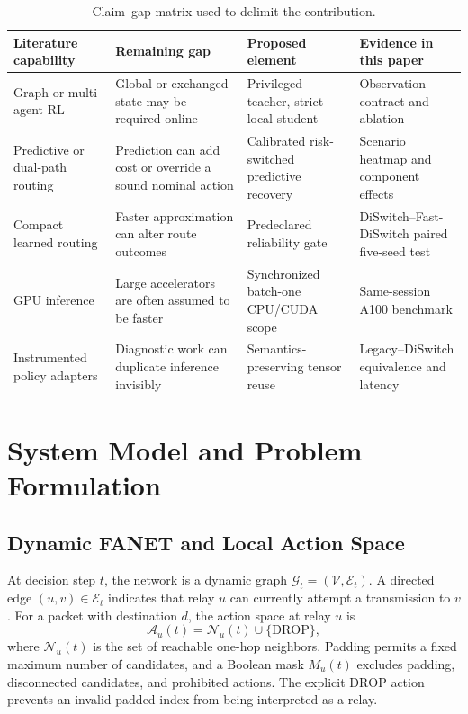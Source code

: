\documentclass{ieeeaccess}
\newcommand{\drop}{\mathrm{DROP}}
\begin{document}
\begin{table}[t]
\caption{Claim--gap matrix used to delimit the contribution.}
\label{tab:novelty}
\centering\small
\begin{tabularx}{\textwidth}{p{}p{}p{}X}
\toprule
Literature capability & Remaining gap & Proposed element & Evidence in this paper \\
\midrule
Graph or multi-agent RL & Global or exchanged state may be required online & Privileged teacher, strict-local student & Observation contract and ablation \\
Predictive or dual-path routing & Prediction can add cost or override a sound nominal action & Calibrated risk-switched predictive recovery & Scenario heatmap and component effects \\
Compact learned routing & Faster approximation can alter route outcomes & Predeclared reliability gate & DiSwitch--Fast-DiSwitch paired five-seed test \\
GPU inference & Large accelerators are often assumed to be faster & Synchronized batch-one CPU/CUDA scope & Same-session A100 benchmark \\
Instrumented policy adapters & Diagnostic work can duplicate inference invisibly & Semantics-preserving tensor reuse & Legacy--DiSwitch equivalence and latency \\
\bottomrule
\end{tabularx}
\end{table}

\section{System Model and Problem Formulation}

\subsection{Dynamic FANET and Local Action Space}

At decision step $t$, the network is a dynamic graph $\mathcal{G}_t=(\mathcal{V},\mathcal{E}_t)$. A directed edge $(u,v)\in\mathcal{E}_t$ indicates that relay $u$ can currently attempt a transmission to $v$. For a packet with destination $d$, the action space at relay $u$ is
\begin{equation}
\mathcal{A}_u(t)=\mathcal{N}_u(t)\cup\{\drop\},
\end{equation}
where $\mathcal{N}_u(t)$ is the set of reachable one-hop neighbors. Padding permits a fixed maximum number of candidates, and a Boolean mask $M_u(t)$ excludes padding, disconnected candidates, and prohibited actions. The explicit $\drop$ action prevents an invalid padded index from being interpreted as a relay.
\end{document}

